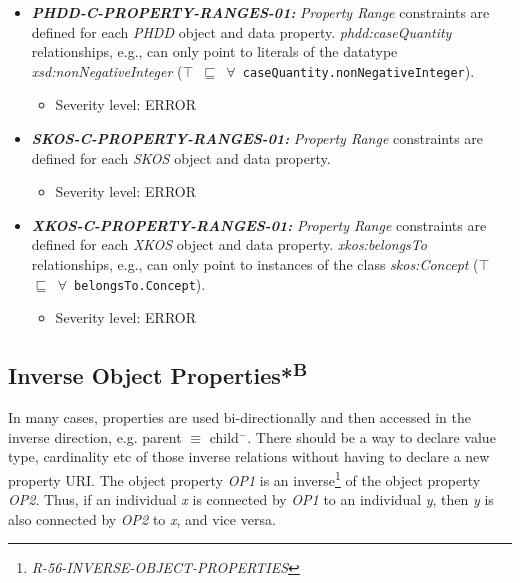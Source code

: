 \documentclass{llncs}
\newcommand{\ms}[1]{\texttt{#1}}
\begin{document}
\begin{itemize}
	\item \textbf{{\em PHDD-C-PROPERTY-RANGES-01:}} 
	{\em Property Range} constraints are defined for each \emph{PHDD} object and data property.
  {\em phdd:caseQuantity} relationships, e.g., can only point to literals of the datatype {\em xsd:nonNegativeInteger} (\ms{$\top$ $\sqsubseteq$ $\forall$ caseQuantity.nonNegativeInteger}).
	\begin{itemize}
		\item Severity level: ERROR
	\end{itemize}
\end{itemize}

\begin{itemize}
	\item \textbf{{\em SKOS-C-PROPERTY-RANGES-01:}} 
	{\em Property Range} constraints are defined for each \emph{SKOS} object and data property.
	\begin{itemize}
		\item Severity level: ERROR
	\end{itemize}
\end{itemize}

\begin{itemize}
	\item \textbf{{\em XKOS-C-PROPERTY-RANGES-01:}} 
	{\em Property Range} constraints are defined for each \emph{XKOS} object and data property.
  {\em xkos:belongsTo} relationships, e.g., can only point to instances of the class {\em skos:Concept} (\ms{$\top$ $\sqsubseteq$ $\forall$ belongsTo.Concept}).
	\begin{itemize}
		\item Severity level: ERROR
	\end{itemize}
\end{itemize}

\subsection{Inverse Object Properties*\textsuperscript{B}}

In many cases, properties are used bi-directionally and then accessed in the inverse direction, e.g. parent $\equiv$ child$^{-}$. There should be a way to declare value type, cardinality etc of those inverse relations without having to declare a new property URI. 
The object property \emph{OP1} is an inverse\footnote{\emph{R-56-INVERSE-OBJECT-PROPERTIES}} of the object property \emph{OP2}. 
Thus, if an individual \emph{x} is connected by \emph{OP1} to an individual \emph{y}, then \emph{y} is also connected by \emph{OP2} to \emph{x}, and vice versa.
\end{document}
